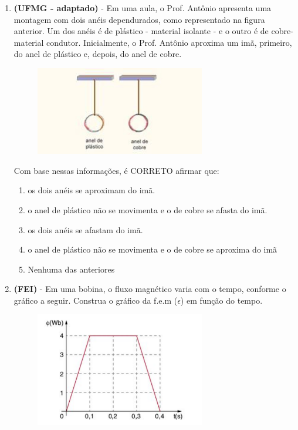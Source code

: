 \documentclass[12pt,letterpaper,fleqn]{article}
\begin{document}
\begin{enumerate}
        \item \textbf{(UFMG - adaptado)} - Em uma aula, o Prof. Antônio apresenta uma montagem com dois anéis dependurados, como representado na figura anterior. Um dos anéis é de plástico - material isolante - e o outro é de cobre- material condutor. Inicialmente, o Prof. Antônio aproxima um imã, primeiro, do anel de plástico e, depois, do anel de cobre.
        
        \begin{figure}[h]
            \centering
            \includegraphics[width=0.7\textwidth]{ex_6.jpg}
        \end{figure}

Com base nessas informações, é CORRETO afirmar que:

\begin{enumerate}
    \item os dois anéis se aproximam do imã.
    \item o anel de plástico não se movimenta e o de cobre se afasta do imã.
    \item os dois anéis se afastam do imã.
    \item o anel de plástico não se movimenta e o de cobre se aproxima do imã
    \item Nenhuma das anteriores
\end{enumerate}

\item \textbf{(FEI)} - Em uma bobina, o fluxo magnético varia com o tempo, conforme o gráfico a seguir. Construa o gráfico da f.e.m ($\epsilon$) em função do tempo.

\begin{figure}[h]
    \centering
    \includegraphics[width=0.7\textwidth]{ex_7.png}
\end{figure}


\end{enumerate}
\end{document}
